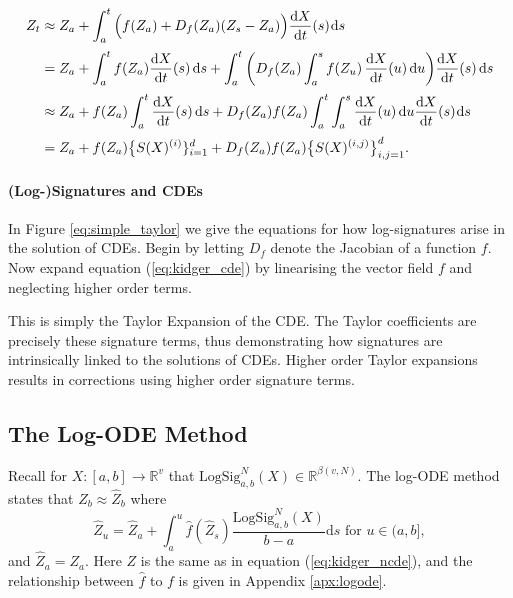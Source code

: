 \documentclass{article}
\newcommand{\m}{\hspace{0.25mm}}
\newcommand{\logsig}{\mathrm{LogSig}}
\newcommand{\dby}{\mathrm{d}}
\newcommand{\reals}{\mathbb{R}}
\begin{document}
\begin{figure*}[t]
    \centering
    \vspace{-0.5em}
    \begin{align*}
    Z_t &\approx Z_a + \int^{t}_{a} \Big(f(Z_a) + D_f(Z_a)(Z_s - Z_a)\Big) \frac{\dby X}{\dby t}(s)\m\dby s\nonumber\\[2pt]
    &= Z_a + \int^{t}_{a} f(Z_a)\frac{\dby X}{\dby t}(s)\,\dby s\nonumber
    + \int^{t}_{a} \bigg(D_f(Z_a)\int^{s}_{a} f(Z_u)\, \frac{\dby X}{\dby t}(u)\,\dby u\bigg)\frac{\dby X}{\dby t}(s)\,\dby s\nonumber\\[2pt]
    &\approx Z_a + f(Z_a)\int^{t}_{a} \frac{\dby X}{\dby t}(s)\,\dby s\nonumber
     + D_f(Z_a)f(Z_a)\int^{t}_{a}\int^{s}_{a} \frac{\dby X}{\dby t}(u)\,\dby u\frac{\dby X}{\dby t}(s)\m\dby s\nonumber\\[2pt]
    &= Z_a + f(Z_a)\big\{S(X)^{(i)}\}_{i = 1}^{d}\nonumber
    + D_f(Z_a)f(Z_a)\big\{S(X)^{(i, j)}\big\}_{i, j = 1}^{d}.
    \end{align*}
    \vspace{-1.5em}
    \caption{Signature (Taylor) expansion of a CDE. The action of the vector field f on the depth-N signature is a matrix-vector product and is fully described, for any N, in \cite{logode2014estimate}.}\label{eq:simple_taylor}
\end{figure*}

\paragraph{(Log-)Signatures and CDEs} In Figure \ref{eq:simple_taylor} we give the equations for how log-signatures arise in the solution of CDEs. Begin by letting $D_f$ denote the Jacobian of a function $f$. Now expand equation (\ref{eq:kidger_cde}) by linearising the vector field $f$ and neglecting higher order terms.

This is simply the Taylor Expansion of the CDE. The Taylor coefficients are precisely these signature terms, thus demonstrating how signatures are intrinsically linked to the solutions of CDEs. Higher order Taylor expansions results in corrections using higher order signature terms.





\subsection{The Log-ODE Method}
Recall for $X \colon [a, b] \to \reals^v$ that $\logsig^N_{a, b}(X) \in \reals^{\beta(v, N)}$. The log-ODE method states that $Z_b \approx \widehat{Z}_b$ where
\begin{equation}
    \widehat{Z}_u = \widehat{Z}_a + \int^{u}_{a} \widehat{f}(\widehat{Z}_s) \frac{\logsig^N_{a, b}(X)}{b-a}\dby s \text{ for } u \in (a, b],
    \label{eq:log-ode}
\end{equation}
and $\widehat{Z}_{a} = Z_{a}$. Here $Z$ is the same as in equation (\ref{eq:kidger_ncde}), and the relationship between $\widehat{f}$ to $f$ is given in Appendix \ref{apx:logode}.
\end{document}
